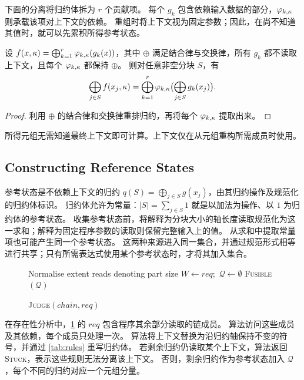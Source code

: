 下面的分离将归约体拆为 $r$ 个贡献项。
每个 $g_k$ 包含依赖输入数据的部分，$\varphi_{k,\kappa}$ 则承载该项对上下文的依赖。
重组时将上下文视为固定参数；因此，在尚不知道其值时，就可以先累积所得参考状态。

\begin{lemma}[Regrouping]
\label{lem:regroup}
设 $f(x,\kappa)=\bigoplus_{k=1}^{r}\varphi_{k,\kappa}(g_k(x))$，其中 $\oplus$ 满足结合律与交换律，所有 $g_k$ 都不读取上下文，且每个 $\varphi_{k,\kappa}$ 都保持 $\oplus$。
则对任意非空分块 $S$，有
\[
\bigoplus_{j\in S} f(x_j,\kappa)=\bigoplus_{k=1}^{r}\varphi_{k,\kappa}\bigl(\bigoplus_{j\in S} g_k(x_j)\bigr).
\]
\end{lemma}

\begin{proof}
利用 $\oplus$ 的结合律和交换律重排归约，再将每个 $\varphi_{k,\kappa}$ 提取出来。
\end{proof}

所得元组无需知道最终上下文即可计算。上下文仅在从元组重构所需成员时使用。

\subsection{Constructing Reference States}
\label{sec:judge}

参考状态是不依赖上下文的归约 $q(S)=\bigoplus_{j\in S}g(x_j)$，由其归约操作及规范化的归约体标识。
归约体允许为常量：$|S|=\sum_{j\in S}1$ 就是以加法为操作、以 $1$ 为归约体的参考状态。
收集参考状态前，将解释为分块大小的轴长度读取规范化为这一求和；解释为固定程序参数的读取则保留完整输入上的值。
从求和中提取常量项也可能产生同一个参考状态。
这两种来源进入同一集合，并通过规范形式相等进行共享；只有所需表达式使用某个参考状态时，才将其加入集合。

\begingroup
\setlength{\intextsep}{2pt}
\begin{figure}
\begin{minipage}{\linewidth}
\begin{algorithm}[H]
\small
\caption{\textsc{Judge}$(\mathit{chain}, \mathit{req})$}
\label{alg:judge}
Normalise extent reads denoting part size\;
$W\leftarrow \mathit{req}$;\ $\mathcal Q\leftarrow\emptyset$\;
\Return \textsc{Fusible}$(\mathcal Q)$\;
\end{algorithm}
\end{minipage}
\end{figure}
在存在性分析中，\cref{alg:judge} 的 $\mathit{req}$ 包含程序其余部分读取的链成员。
算法访问这些成员及其依赖，每个成员只处理一次。
算法将上下文替换为沿归约轴保持不变的符号，并通过 \cref{tab:rules} 重写归约体。
若剩余归约仍读取某个上下文，算法返回 \textsc{Stuck}，表示这些规则无法分离该上下文。
否则，剩余归约作为参考状态加入 $\mathcal Q$，每个不同的归约对应一个元组分量。

